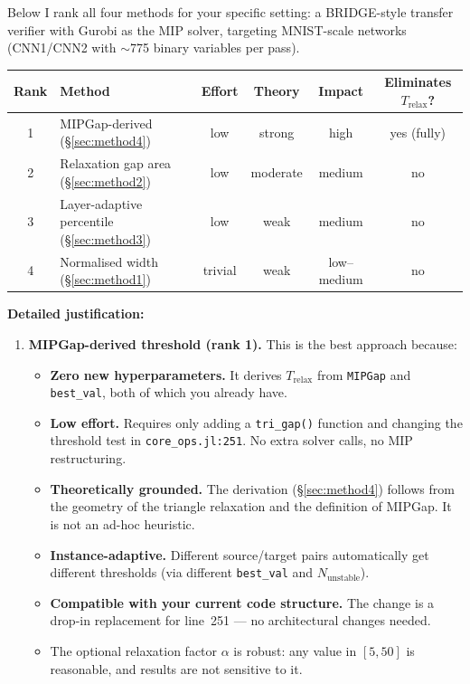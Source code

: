 \documentclass[11pt,a4paper]{article}
\newcommand{\Trelax}{T_{\mathrm{relax}}}
\begin{document}
\begin{verdict}
Below I rank all four methods for your specific setting: a BRIDGE-style
transfer verifier with Gurobi as the MIP solver, targeting MNIST-scale networks
(CNN1/CNN2 with $\sim$775 binary variables per pass).

\bigskip

\renewcommand{\arraystretch}{1.3}
\begin{tabular}{@{}c l c c c c@{}}
\toprule
\textbf{Rank} & \textbf{Method} & \textbf{Effort} &
  \textbf{Theory} & \textbf{Impact} & \textbf{Eliminates $\Trelax$?} \\
\midrule
1 & MIPGap-derived (\S\ref{sec:method4})
  & \textcolor{green!50!black}{low} & \textcolor{green!50!black}{strong}
  & \textcolor{green!50!black}{high} & yes (fully) \\
2 & Relaxation gap area (\S\ref{sec:method2})
  & low & \textcolor{blue!70}{moderate}
  & \textcolor{blue!70}{medium} & no \\
3 & Layer-adaptive percentile (\S\ref{sec:method3})
  & low & \textcolor{orange!80!black}{weak}
  & \textcolor{blue!70}{medium} & no \\
4 & Normalised width (\S\ref{sec:method1})
  & trivial & \textcolor{orange!80!black}{weak}
  & \textcolor{orange!80!black}{low--medium} & no \\
\bottomrule
\end{tabular}

\bigskip

\textbf{Detailed justification:}

\begin{enumerate}[leftmargin=2em, label=\textbf{\arabic*.}]

\item \textbf{MIPGap-derived threshold (rank 1).}
This is the best approach because:
\begin{itemize}
  \item \textbf{Zero new hyperparameters.}  It derives $\Trelax$ from
        \texttt{MIPGap} and \texttt{best\_val}, both of which you already have.
  \item \textbf{Low effort.}  Requires only adding a \texttt{tri\_gap()}
        function and changing the threshold test in \texttt{core\_ops.jl:251}.
        No extra solver calls, no MIP restructuring.
  \item \textbf{Theoretically grounded.}  The derivation
        (\S\ref{sec:method4}) follows from the geometry of the triangle
        relaxation and the definition of MIPGap.  It is not an ad-hoc
        heuristic.
  \item \textbf{Instance-adaptive.}  Different source/target pairs
        automatically get different thresholds (via different
        \texttt{best\_val} and $N_{\mathrm{unstable}}$).
  \item \textbf{Compatible with your current code structure.}  The
        change is a drop-in replacement for line~251 --- no architectural
        changes needed.
  \item The optional relaxation factor $\alpha$ is robust: any value in
        $[5, 50]$ is reasonable, and results are not sensitive to it.
\end{itemize}


\end{enumerate}
\end{verdict}
\end{document}
